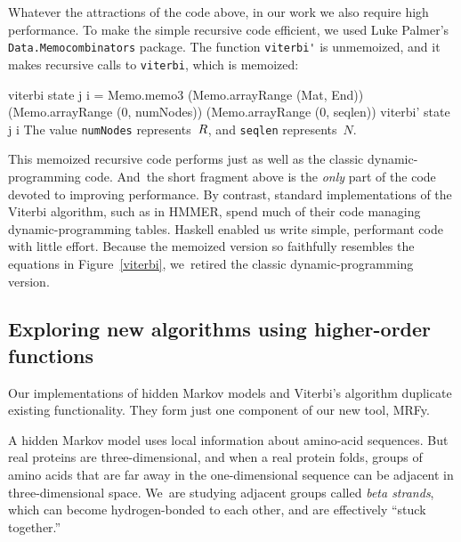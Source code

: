 \documentclass[preprint,nonatbib,blockstyle,nocopyrightspace,times]{sigplanconf}
\newcommand\alignwidth{\ensuremath R} %
\newcommand\figref[1]{Figure~\ref{#1}}
\newenvironment{smallverbatim}{\par\small\verbatim}{\endverbatim}
\begin{document}
Whatever the attractions of the code above, in our work we also
require high performance.
To make the simple recursive code efficient, we used Luke Palmer's
\texttt{Data.Memocombinators} package.
The function \verb+viterbi'+ is unmemoized,
and it makes recursive calls to \verb+viterbi+, which is memoized:
\begin{smallverbatim}
viterbi state j i = 
  Memo.memo3 (Memo.arrayRange (Mat, End)) 
             (Memo.arrayRange (0, numNodes))
             (Memo.arrayRange (0, seqlen)) 
             viterbi' state j i
\end{smallverbatim}
The value
\texttt{numNodes} represents~$\alignwidth$,
and \texttt{seqlen} represents~$N$.

This memoized recursive code performs just as well as the classic
dynamic-programming code.
And~the short fragment above is the \emph{only} part of the code
devoted to improving performance.
By contrast, standard implementations of the Viterbi algorithm, such as in HMMER,
spend much of their code 
managing dynamic-programming tables.
Haskell enabled us write simple, performant code with little effort.
%
Because the memoized version so faithfully resembles the equations in
\figref{viterbi}, we~retired the classic dynamic-programming version.





\subsection{Exploring new algorithms using higher-order functions}



Our implementations of hidden Markov models and Viterbi's algorithm
duplicate existing functionality.
They form just one component of our new tool, MRFy.

A hidden Markov model uses local information about
amino-acid sequences.
But real proteins are three-dimensional,
and when a real protein folds, groups of amino acids
that are far away in the one-dimensional sequence can be
adjacent in three-dimensional space.
We~are studying adjacent groups called \emph{beta strands}, which
can become hydrogen-bonded to each other,
and are effectively ``stuck together.''
\end{document}
